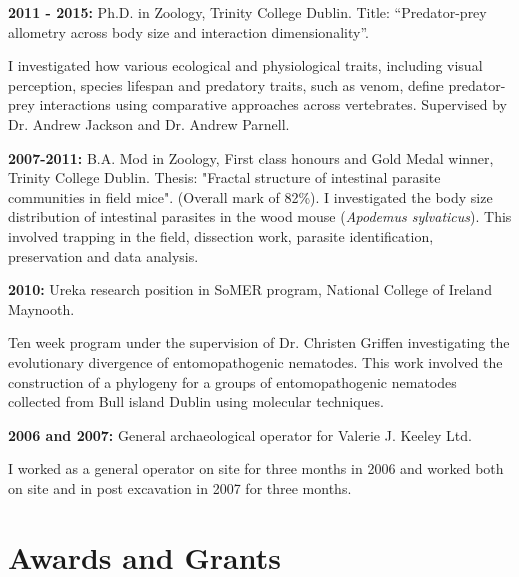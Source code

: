 \documentclass[10pt,a4paper]{article}
\begin{document}
\raggedright	
\textbf{2011 - 2015:} Ph.D. in Zoology, Trinity College Dublin. Title: “Predator-prey allometry across body size and interaction dimensionality”.\\ \par{\fontsize{10.5}{10} I investigated how various ecological and physiological traits, including visual perception, species lifespan and predatory traits, such as venom, define predator-prey interactions using comparative approaches across vertebrates. Supervised by Dr. Andrew Jackson and Dr. Andrew Parnell.
\bigskip}


\textbf{2007-2011:} B.A. Mod in Zoology, First class honours and Gold Medal winner, Trinity College Dublin.
Thesis: "Fractal structure of intestinal parasite communities in field mice". (Overall mark of 82\%).
I investigated the body size distribution of intestinal parasites in the wood mouse (\textit{Apodemus sylvaticus}). This involved trapping in the field, dissection work, parasite identification, preservation and data analysis.
\bigskip

\textbf{2010:} Ureka research position in SoMER program, National College of Ireland Maynooth.\\
\par{\fontsize{10.5}{10} Ten week program under the supervision of Dr. Christen Griffen investigating the evolutionary divergence of entomopathogenic nematodes. This work involved the construction of a phylogeny for a groups of entomopathogenic nematodes collected from Bull island Dublin using molecular techniques.}
\bigskip

\textbf{2006 and 2007:} General archaeological operator for Valerie J. Keeley Ltd.\\
\par{\fontsize{10.5}{10} I worked as a general operator on site for three months in 2006 and worked both on site
and in post excavation in 2007 for three months.
}
\bigskip



\section{Awards and Grants}

\end{document}
